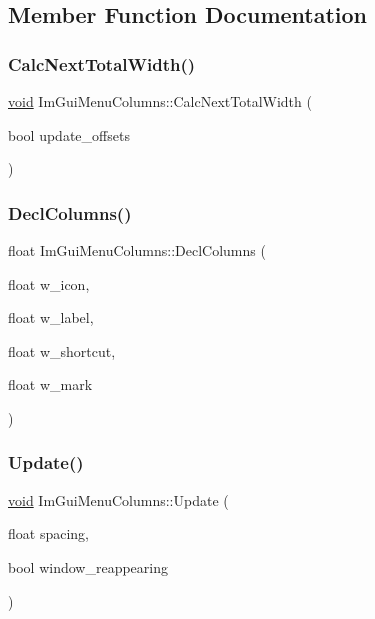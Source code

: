 \subsection{Member Function Documentation}
\mbox{\label{structImGuiMenuColumns_a76bf28ca1ad728afce787f48e1645138}} 
\subsubsection{\texorpdfstring{Calc\+Next\+Total\+Width()}{CalcNextTotalWidth()}}
{\footnotesize\ttfamily \hyperlink{imgui__impl__opengl3__loader_8h_ac668e7cffd9e2e9cfee428b9b2f34fa7}{void} Im\+Gui\+Menu\+Columns\+::\+Calc\+Next\+Total\+Width (\begin{DoxyParamCaption}\item[{bool}]{update\+\_\+offsets }\end{DoxyParamCaption})}

\mbox{\label{structImGuiMenuColumns_a85fedb03fec0c73555220b74ceaa2bb8}} 
\subsubsection{\texorpdfstring{Decl\+Columns()}{DeclColumns()}}
{\footnotesize\ttfamily float Im\+Gui\+Menu\+Columns\+::\+Decl\+Columns (\begin{DoxyParamCaption}\item[{float}]{w\+\_\+icon,  }\item[{float}]{w\+\_\+label,  }\item[{float}]{w\+\_\+shortcut,  }\item[{float}]{w\+\_\+mark }\end{DoxyParamCaption})}

\mbox{\label{structImGuiMenuColumns_aae99240b9c8e9380f829921da5e337f2}} 
\subsubsection{\texorpdfstring{Update()}{Update()}}
{\footnotesize\ttfamily \hyperlink{imgui__impl__opengl3__loader_8h_ac668e7cffd9e2e9cfee428b9b2f34fa7}{void} Im\+Gui\+Menu\+Columns\+::\+Update (\begin{DoxyParamCaption}\item[{float}]{spacing,  }\item[{bool}]{window\+\_\+reappearing }\end{DoxyParamCaption})}



